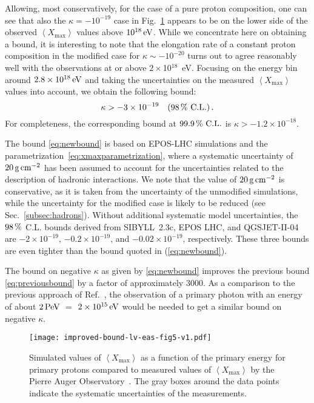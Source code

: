 \documentclass[aps,prd,preprint,longbibliography]{revtex4-1}
\begin{document}
Allowing, most conservatively, for the case of a pure proton composition,
one can see that also the $\kappa = -10^{-19}$ case
in Fig.~\ref{fig:data}  appears to be on the lower side of
the observed $\left<X_\text{max}\right>$ values above $\unit[10^{18}]{eV}$.
While we concentrate here on obtaining a bound,
it is interesting to note that the elongation rate
of a constant proton composition
in the modified case for $\kappa \sim -10^{-20}$
turns out to agree reasonably well with the observations
at or above $2\times$10$^{18}$~eV.
Focusing on the energy bin around $\unit[2.8 \times10^{18}]{eV}$
and taking the uncertainties on the measured
$\left<X_\text{max}\right>$ values into account,
we obtain the following bound:
\begin{equation}
\label{eq:newbound}
\kappa > -3 \times 10^{-19} ~~~  \text{($\unit[98]{\%}$ C.L.)}\,.
\end{equation}
For completeness, the corresponding bound at $\text{$\unit[99.9]{\%}$ C.L.}$
is $\kappa > -1.2 \times 10^{-18}$.  %


The bound \eqref{eq:newbound}
is based on EPOS-LHC simulations
and the parametrization~\eqref{eq:xmaxparametrization},
where a systematic uncertainty of $\unit[20]{g\,cm^{-2}}$ has been assumed to account for the
uncertainties related to the description of hadronic interactions.
We note that the value of $\unit[20]{g\,cm^{-2}}$ is conservative,
as it is taken from the
uncertainty of the unmodified simulations, while the uncertainty for the
modified case is likely to be reduced (see Sec.~\ref{subsec:hadrons}).
Without additional systematic model uncertainties,
the $\unit[98]{\%}$ C.L.
bounds derived from SIBYLL~2.3c, EPOS LHC, and QGSJET-II-04
are $-2 \times 10^{-19}$, $-0.2 \times 10^{-19}$,
and $-0.02 \times 10^{-19}$, respectively.
These three bounds are even tighter than
the bound quoted in (\ref{eq:newbound}).

The bound on negative $\kappa$ as given by \eqref{eq:newbound}
improves the previous
bound \eqref{eq:previousbound} by a factor of approximately $3000$.
As a comparison to the previous
approach of Ref.~\cite{KlinkhamerSchreck2008},
the observation of a primary photon with an energy of about
$\unit[2]{PeV}$ $=$ $\unit[2\times 10^{15}]{eV}$
would be needed to get a similar bound on negative $\kappa$.

\begin{figure}[t]  %
\centering
\vspace*{-0mm}
\texttt{[image: improved-bound-lv-eas-fig5-v1.pdf]}
\vspace*{-0mm}
\caption{Simulated values of
$\left<X_\text{max}\right>$ as a function of the primary
energy for primary protons compared to
measured values of $\left<X_\text{max}\right>$ by
the Pierre Auger Observatory~\cite{Auger2014}. The gray boxes
around the data points indicate the systematic uncertainties of the measurements.}
\label{fig:data}%
\end{figure}
\end{document}

